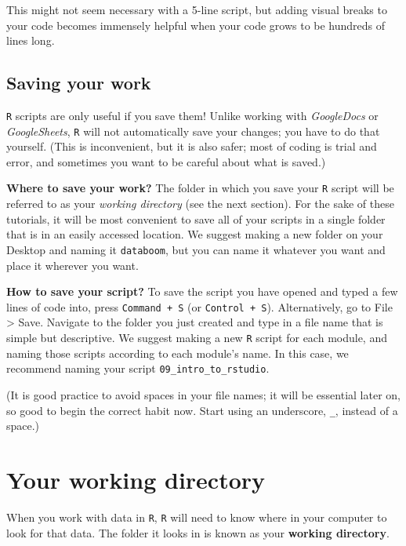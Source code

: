 \documentclass[
]{book}
\begin{document}
This might not seem necessary with a 5-line script, but adding visual breaks to your code becomes immensely helpful when your code grows to be hundreds of lines long.

\hypertarget{saving-your-work}{%
\subsection*{Saving your work}\label{saving-your-work}}

\texttt{R} scripts are only useful if you save them! Unlike working with \emph{GoogleDocs} or \emph{GoogleSheets}, \texttt{R} will not automatically save your changes; you have to do that yourself. (This is inconvenient, but it is also safer; most of coding is trial and error, and sometimes you want to be careful about what is saved.)

\textbf{Where to save your work?} The folder in which you save your \texttt{R} script will be referred to as your \emph{working directory} (see the next section). For the sake of these tutorials, it will be most convenient to save all of your scripts in a single folder that is in an easily accessed location. We suggest making a new folder on your Desktop and naming it \texttt{databoom}, but you can name it whatever you want and place it wherever you want.

\textbf{How to save your script?} To save the script you have opened and typed a few lines of code into, press \texttt{Command\ +\ S} (or \texttt{Control\ +\ S}). Alternatively, go to File \textgreater{} Save. Navigate to the folder you just created and type in a file name that is simple but descriptive. We suggest making a new \texttt{R} script for each module, and naming those scripts according to each module's name. In this case, we recommend naming your script \texttt{09\_intro\_to\_rstudio}.

(It is good practice to avoid spaces in your file names; it will be essential later on, so good to begin the correct habit now. Start using an underscore, \texttt{\_}, instead of a space.)

\hypertarget{wd}{%
\section*{Your working directory}\label{wd}}

When you work with data in \texttt{R}, \texttt{R} will need to know where in your computer to look for that data. The folder it looks in is known as your \textbf{working directory}.
\end{document}
